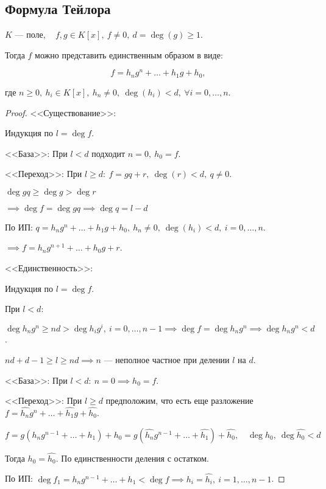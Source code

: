 \subsection{Формула Тейлора}

\begin{theorem-non}
    $K$ --- поле$,\quad f, g \in K[x],~ f \neq 0,~ d = \deg(g) \geq 1$.

    Тогда $f$ можно представить единственным образом в виде:

    \[f = h_ng^n + \dots + h_1g + h_0,\]

    где $n \geq 0,~ h_i \in K[x],~ h_n \neq 0,~ \deg(h_i) < d,~ \forall i = 0, \ldots, n$.
\end{theorem-non}

\begin{proof}

    <<Существование>>:

    Индукция по $l = \deg f$.

    <<База>>: При $l < d$ подходит $n = 0,~ h_0 = f$.

    <<Переход>>: При $l \geq d:~ f = gq + r,~ \deg(r) < d,~ q \neq 0$.

    $\deg gq \geq \deg g > \deg r$

    $\implies \deg f = \deg gq \implies \deg q = l - d$
    
    По ИП: $q = h_ng^n + \dots + h_1g + h_0,~ h_n \neq 0,~ \deg(h_i) < d,~ i = 0, \dots, n$.

    $\implies f = h_ng^{n + 1} + \dots + h_0g + r$.

    <<Единственность>>:

    Индукция по $l = \deg f$.

    При $l < d$:

    $\deg h_ng^n \geq nd > \deg h_ig^i,~ i = 0, \ldots, n - 1 \implies \deg f = \deg h_ng^n \implies \deg h_ng^n < d$.

    $nd + d - 1 \geq l \geq nd \implies n$ --- неполное частное при делении $l$ на $d$.

    <<База>>: При $l < d:~ n = 0 \implies h_0 = f$.

    <<Переход>>: При $l \geq d$ предположим, что есть еще разложение $f = \hat{h_n}g^n + \dots + \hat{h_1}g + \hat{h_0}$.

    $f = g(h_ng^{n - 1} + \dots + h_1) + h_0 = g(\hat{h_n}g^{n - 1} + \dots + \hat{h_1}) + \hat{h_0},\quad \deg h_0, ~\deg \hat{h_0} < d$

    Тогда $h_0 = \hat{h_0}$. По единственности деления с остатком.

    По ИП: $\deg f_1 = h_ng^{n - 1} + \dots + h_1 < \deg f \implies h_i = \hat{h_i},~ i = 1, \dots, n - 1$.
\end{proof}


